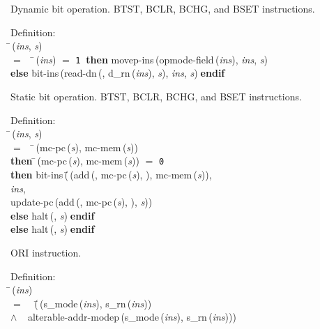  Dynamic bit operation.  BTST, BCLR, BCHG, and BSET instructions.
\begin{tabbing}{\sc Definition}: \\  
\=\,({\it{ins\/}}, {\it{s\/}}) \\ 
$=$$\;\;\;\;$\=\,({\it{ins\/}}) $=$ {\tt{1}}$\;\;${\bf then }{\rm{movep-ins}}\,({\rm{opmode-field}}\,({\it{ins\/}}), {\it{ins\/}}, {\it{s\/}}) \\ 
{\bf else }{\rm{bit-ins}}\,({\rm{read-dn}}\,({}, {\rm{d\_rn}}\,({\it{ins\/}}), {\it{s\/}}), {\it{ins\/}}, {\it{s\/}})$\;${\bf  endif}\-\-
\end{tabbing}

 Static bit operation.  BTST, BCLR, BCHG, and BSET instructions.
\begin{tabbing}{\sc Definition}: \\  
\=\,({\it{ins\/}}, {\it{s\/}}) \\ 
$=$$\;\;\;\;$\=\,({\rm{mc-pc}}\,({\it{s\/}}), {\rm{mc-mem}}\,({\it{s\/}})) \\ 
{\bf then }\=\,({\rm{mc-pc}}\,({\it{s\/}}), {\rm{mc-mem}}\,({\it{s\/}})) $=$ {\tt{0}} \\ 
{\bf then }{\rm{bit-ins}}\,(\=\,({\rm{add}}\,({}, {\rm{mc-pc}}\,({\it{s\/}}), {}), {\rm{mc-mem}}\,({\it{s\/}})), \\ 
{\it{ins\/}}, \\ 
{\rm{update-pc}}\,({\rm{add}}\,({}, {\rm{mc-pc}}\,({\it{s\/}}), {}), {\it{s\/}}))\- \\ 
{\bf else }{\rm{halt}}\,({}, {\it{s\/}})$\;${\bf  endif}\- \\ 
{\bf else }{\rm{halt}}\,({}, {\it{s\/}})$\;${\bf  endif}\-\-
\end{tabbing}

 ORI instruction.
\begin{tabbing}{\sc Definition}: \\  
\=\,({\it{ins\/}}) \\ 
$=$$\;\;\;\;$(\=\,({\rm{s\_mode}}\,({\it{ins\/}}), {\rm{s\_rn}}\,({\it{ins\/}})) \\ 
$\wedge$$\;\;\;\;${\rm{alterable-addr-modep}}\,({\rm{s\_mode}}\,({\it{ins\/}}), {\rm{s\_rn}}\,({\it{ins\/}})))\-\-
\end{tabbing}

